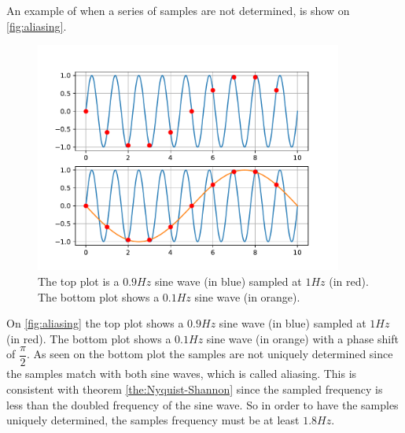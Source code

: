 \noindent An example of when a series of samples are not determined, is show on \autoref{fig:aliasing}. 

\begin{figure}[H]
    \centering
    \includegraphics[width=0.9\textwidth]{figures/aliasingFig.pdf}
    \caption{The top plot is a $0.9\si{Hz}$ sine wave (in blue) sampled at $1\si{Hz}$ (in red). The bottom plot shows a $0.1\si{Hz}$ sine wave (in orange).}
    \label{fig:aliasing}
\end{figure}
On \autoref{fig:aliasing} the top plot shows a $0.9\si{Hz}$ sine wave (in blue) sampled at $1\si{Hz}$ (in red). The bottom plot shows a $0.1\si{Hz}$ sine wave (in orange) with a phase shift of $\dfrac{\pi}{2}$. As seen on the bottom plot the samples are not uniquely determined since the samples match with both sine waves, which is called aliasing. This is consistent with theorem \ref{the:Nyquist-Shannon} since the sampled frequency is less than the doubled frequency of the sine wave. So in order to have the samples uniquely determined, the samples frequency must be at least $1.8\si{Hz}$.  


